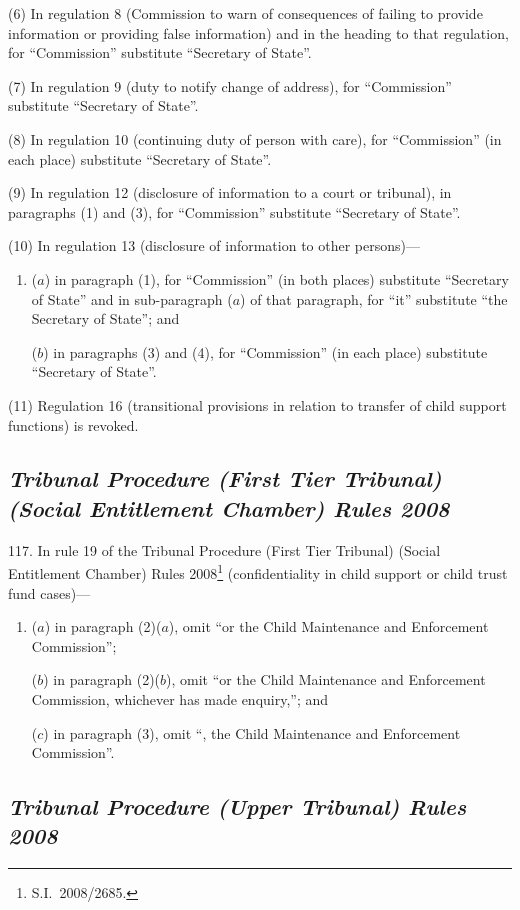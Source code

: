 \documentclass[12pt,a4paper]{article}
\begin{document}
(6) In regulation 8 (Commission to warn of consequences of failing to provide information or providing false information) and in the heading to that regulation, for “Commission” substitute “Secretary of State”.

(7) In regulation 9 (duty to notify change of address), for “Commission” substitute “Secretary of State”.

(8) In regulation 10 (continuing duty of person with care), for “Commission” (in each place) substitute “Secretary of State”.

(9) In regulation 12 (disclosure of information to a court or tribunal), in paragraphs (1) and (3), for “Commission” substitute “Secretary of State”.

(10) In regulation 13 (disclosure of information to other persons)—
\begin{enumerate}\item[]
($a$) in paragraph (1), for “Commission” (in both places) substitute “Secretary of State” and in sub-paragraph ($a$)  of that paragraph, for “it” substitute “the Secretary of State”; and

($b$) in paragraphs (3) and (4), for “Commission” (in each place) substitute “Secretary of State”.
\end{enumerate}

(11) Regulation 16 (transitional provisions in relation to transfer of child support functions) is revoked.

\subsection*{\itshape Tribunal Procedure (First Tier Tribunal) (Social Entitlement Chamber) Rules 2008}

117.  In rule 19 of the Tribunal Procedure (First Tier Tribunal) (Social Entitlement Chamber) Rules 2008\footnote{S.I.~2008/2685.} (confidentiality in child support or child trust fund cases)—
\begin{enumerate}\item[]
($a$) in paragraph (2)($a$), omit “or the Child Maintenance and Enforcement Commission”;

($b$) in paragraph (2)($b$), omit “or the Child Maintenance and Enforcement Commission, whichever has made enquiry,”; and

($c$) in paragraph (3), omit “, the Child Maintenance and Enforcement Commission”.
\end{enumerate}

\subsection*{\itshape Tribunal Procedure (Upper Tribunal) Rules 2008}
\end{document}
